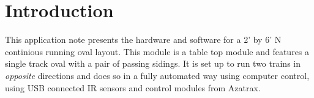
\chapter{Introduction}
\label{chapt:Introduction}

This application note presents the hardware and software for a 2' by 6'
N continious running oval layout.  This module is a table top module
and features a single track oval with a pair of passing sidings.  It is
set up to run two trains in \textit{opposite} directions and does so in
a fully automated way using computer control, using USB connected IR
sensors and control modules from Azatrax.

